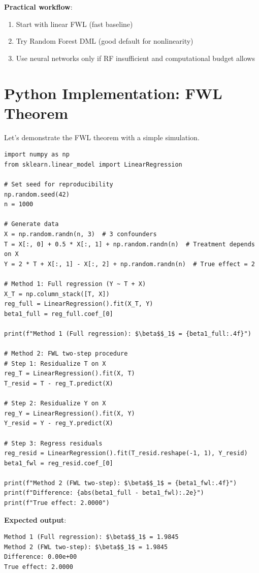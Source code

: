 \textbf{Practical workflow}:
\begin{enumerate}
\item Start with linear FWL (fast baseline)
\item Try Random Forest DML (good default for nonlinearity)
\item Use neural networks only if RF insufficient and computational budget allows
\end{enumerate}

\section{Python Implementation: FWL
Theorem}\label{_python_implementation_fwl_theorem}

Let's demonstrate the FWL theorem with a simple simulation.

\begin{verbatim}
import numpy as np
from sklearn.linear_model import LinearRegression

# Set seed for reproducibility
np.random.seed(42)
n = 1000

# Generate data
X = np.random.randn(n, 3)  # 3 confounders
T = X[:, 0] + 0.5 * X[:, 1] + np.random.randn(n)  # Treatment depends on X
Y = 2 * T + X[:, 1] - X[:, 2] + np.random.randn(n)  # True effect = 2

# Method 1: Full regression (Y ~ T + X)
X_T = np.column_stack([T, X])
reg_full = LinearRegression().fit(X_T, Y)
beta1_full = reg_full.coef_[0]

print(f"Method 1 (Full regression): $\beta$$_1$ = {beta1_full:.4f}")

# Method 2: FWL two-step procedure
# Step 1: Residualize T on X
reg_T = LinearRegression().fit(X, T)
T_resid = T - reg_T.predict(X)

# Step 2: Residualize Y on X
reg_Y = LinearRegression().fit(X, Y)
Y_resid = Y - reg_Y.predict(X)

# Step 3: Regress residuals
reg_resid = LinearRegression().fit(T_resid.reshape(-1, 1), Y_resid)
beta1_fwl = reg_resid.coef_[0]

print(f"Method 2 (FWL two-step): $\beta$$_1$ = {beta1_fwl:.4f}")
print(f"Difference: {abs(beta1_full - beta1_fwl):.2e}")
print(f"True effect: 2.0000")
\end{verbatim}

\textbf{Expected output}:

\begin{verbatim}
Method 1 (Full regression): $\beta$$_1$ = 1.9845
Method 2 (FWL two-step): $\beta$$_1$ = 1.9845
Difference: 0.00e+00
True effect: 2.0000
\end{verbatim}

